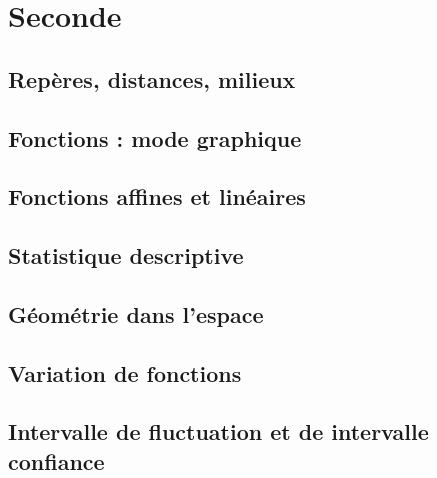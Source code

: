 \documentclass[a4paper,12pt]{book}
\begin{document}



\newpage



\tableofcontents

\newpage

\part{Seconde}

\chapter{Repères, distances, milieux}


\chapter{Fonctions : mode graphique}


\chapter{Fonctions affines et linéaires}


\chapter{Statistique descriptive}


\chapter{Géométrie dans l'espace}


\chapter{Variation de fonctions}

\chapter{Intervalle de fluctuation et de intervalle confiance}

\end{document}
